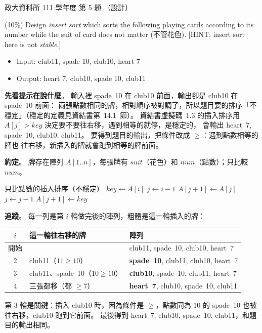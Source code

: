 \begin{pastexam}[label={px:nccu-111-dsa-05}]{政大資科所 111 學年度 第 5 題}
（設計）

(10\%) Design \textit{insert sort} which sorts the following playing cards according to its number while the suit of card does not matter (不管花色). [HINT: insert sort here is not \textit{stable}.]
\begin{itemize}
\item Input: club11, spade 10, club10, heart 7
\item Output: heart 7, club10, spade 10, club11
\end{itemize}
\end{pastexam}

\begin{pastsoln}
\textbf{先看提示在說什麼}。 輸入裡 spade~10 在 club10 前面，輸出卻是 club10 在 spade~10 前面：
兩張點數相同的牌，相對順序被對調了，所以題目要的排序「不穩定」（穩定的定義見資結書第~14.1~節）。
資結書虛擬碼~1.3 的插入排序用 $A[j] > \mathit{key}$ 決定要不要往右移，遇到相等的就停，是穩定的，
會輸出 heart~7, spade~10, club10, club11。 要得到題目的輸出，把條件改成 $\ge$：遇到點數相等的牌也
往右移，新插入的牌就會跑到相等的牌前面。

\textbf{約定}。 牌存在陣列 $A[1..n]$，每張牌有 $\mathit{suit}$（花色）和 $\mathit{num}$（點數）；只比較
$\mathit{num}$。

\begin{pseudo}{只比點數的插入排序（不穩定）}
        \State $\mathit{key} \gets A[i]$ 
        \State $j \gets i - 1$
            \State $A[j + 1] \gets A[j]$
            \State $j \gets j - 1$
        \EndWhile
        \State $A[j + 1] \gets \mathit{key}$
    \EndFor
\EndProcedure
\end{pseudo}

\textbf{追蹤}。 每一列是第 $i$ 輪做完後的陣列，粗體是這一輪插入的牌：
\begin{center}
\begin{tabular}{cll}
\toprule
$i$ & 這一輪往右移的牌 & 陣列 \\
\midrule
開始 & & club11, spade~10, club10, heart~7 \\
2 & club11（$11 \ge 10$） & \textbf{spade~10}, club11, club10, heart~7 \\
3 & club11、spade~10（$10 \ge 10$） & \textbf{club10}, spade~10, club11, heart~7 \\
4 & 三張都移（都 $\ge 7$） & \textbf{heart~7}, club10, spade~10, club11 \\
\bottomrule
\end{tabular}
\end{center}
第 $3$ 輪是關鍵：插入 club10 時，因為條件是 $\ge$，點數同為 $10$ 的 spade~10 也被往右移，club10
跑到它前面。 最後得到 heart~7, club10, spade~10, club11，和題目的輸出相同。


\end{pastsoln}
